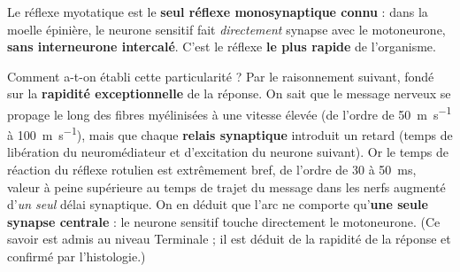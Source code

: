 \documentclass[11pt]{article}
\begin{document}
\begin{propriete}
Le réflexe myotatique est le \textbf{seul réflexe monosynaptique connu} : dans la moelle épinière, le neurone sensitif fait \emph{directement} synapse avec le motoneurone, \textbf{sans interneurone intercalé}. C'est le réflexe \textbf{le plus rapide} de l'organisme.
\end{propriete}

Comment a-t-on établi cette particularité ? Par le raisonnement suivant, fondé sur la \textbf{rapidité exceptionnelle} de la réponse. On sait que le message nerveux se propage le long des fibres myélinisées à une vitesse élevée (de l'ordre de \SI{50}{m.s^{-1}} à \SI{100}{m.s^{-1}}), mais que chaque \textbf{relais synaptique} introduit un retard (temps de libération du neuromédiateur et d'excitation du neurone suivant). Or le temps de réaction du réflexe rotulien est extrêmement bref, de l'ordre de \num{30} à \SI{50}{ms}, valeur à peine supérieure au temps de trajet du message dans les nerfs augmenté d'\emph{un seul} délai synaptique. On en déduit que l'arc ne comporte qu'\textbf{une seule synapse centrale} : le neurone sensitif touche directement le motoneurone. (Ce savoir est admis au niveau Terminale ; il est déduit de la rapidité de la réponse et confirmé par l'histologie.)
\end{document}
